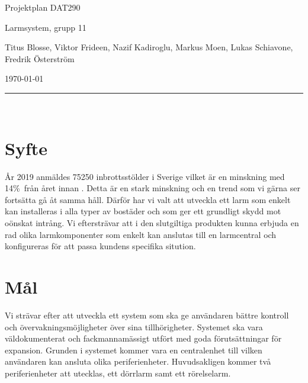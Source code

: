 \documentclass[a4paper]{article}
\newcommand\namn{Larmsystem}
\begin{document}
%
%

\thispagestyle{empty}

\begin{center}
    \parskip=14pt%
    \vspace*{3\parskip}%

    {\LARGE Projektplan DAT290}

    {\large \namn, grupp 11

    Titus Blosse, Viktor Frideen, Nazif Kadiroglu, Markus Moen, Lukas Schiavone, Fredrik Österström

    \today}

    \rule{7cm}{0.4pt}\\
\end{center}
\newpage

%
%

\thispagestyle{empty}

\tableofcontents
\newpage

%
%


\section{Syfte}

År 2019 anmäldes 75250  inbrottsstölder i Sverige vilket är en minskning med 14\%\ från året innan \cite{brastold}. Detta är en stark minskning och en trend som vi gärna ser fortsätta gå åt samma håll. Därför har vi valt att utveckla ett larm som enkelt kan installeras i alla typer av bostäder och som ger ett grundligt skydd mot oönskat intrång. Vi eftersträvar att i den slutgiltiga produkten kunna erbjuda en rad olika larmkomponenter som enkelt kan anslutas till en larmcentral och konfigureras för att passa kundens specifika sitution.


\section{Mål}

Vi strävar efter att utveckla ett system som ska ge användaren bättre kontroll och övervakningsmöjligheter över sina tillhörigheter. Systemet ska vara väldokumenterat och fackmannamässigt utfört med goda förutsättningar för expansion. Grunden i systemet kommer vara en centralenhet till vilken användaren kan ansluta olika periferienheter. Huvudsakligen kommer två periferienheter att utecklas, ett dörrlarm samt ett rörelselarm.
\end{document}
